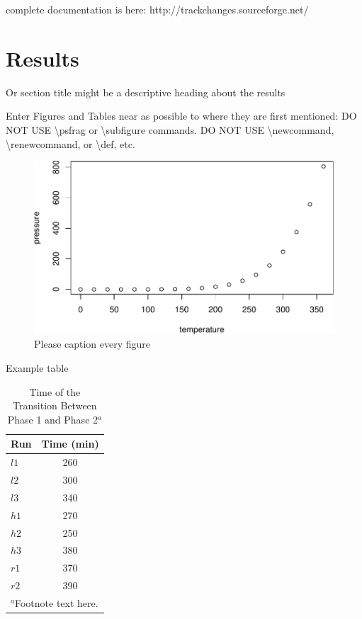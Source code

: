 \documentclass[draft,linenumbers]{agujournal2018}
\begin{document}
complete documentation is here: http://trackchanges.sourceforge.net/

\section{Results}

Or section title might be a descriptive heading about the results

Enter Figures and Tables near as possible to where they are first
mentioned: DO NOT USE \textbackslash{}psfrag or
\textbackslash{}subfigure commands. DO NOT USE
\textbackslash{}newcommand, \textbackslash{}renewcommand, or
\textbackslash{}def, etc.

\begin{figure}[h]
\includegraphics{True_Uncertainty_of_Water_Level_Measurements_after_Addressing_Temperature_Effects_files/figure-latex/unnamed-chunk-2-1} \caption{Please caption every figure}\label{fig:unnamed-chunk-2}
\end{figure}

Example table

\begin{table}
 \caption{Time of the Transition Between Phase 1 and Phase 2$^{a}$}
 \centering
 \begin{tabular}{l c}
 \hline
  Run  & Time (min)  \\
 \hline
   $l1$  & 260   \\
   $l2$  & 300   \\
   $l3$  & 340   \\
   $h1$  & 270   \\
   $h2$  & 250   \\
   $h3$  & 380   \\
   $r1$  & 370   \\
   $r2$  & 390   \\
 \hline
 \multicolumn{2}{l}{$^{a}$Footnote text here.}
 \end{tabular}
 \end{table}
\end{document}
